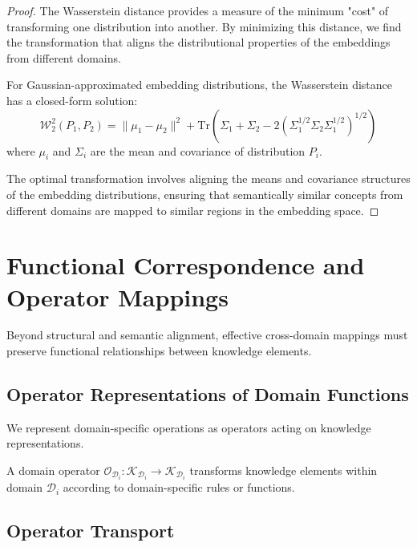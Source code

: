 \begin{proof}
The Wasserstein distance provides a measure of the minimum "cost" of transforming one distribution into another. By minimizing this distance, we find the transformation that aligns the distributional properties of the embeddings from different domains.

For Gaussian-approximated embedding distributions, the Wasserstein distance has a closed-form solution:
\begin{equation}
\mathcal{W}_2^2(P_1, P_2) = \|\mu_1 - \mu_2\|^2 + \text{Tr}(\Sigma_1 + \Sigma_2 - 2(\Sigma_1^{1/2}\Sigma_2\Sigma_1^{1/2})^{1/2})
\end{equation}
where $\mu_i$ and $\Sigma_i$ are the mean and covariance of distribution $P_i$.

The optimal transformation involves aligning the means and covariance structures of the embedding distributions, ensuring that semantically similar concepts from different domains are mapped to similar regions in the embedding space.
\end{proof}

\section{Functional Correspondence and Operator Mappings}

Beyond structural and semantic alignment, effective cross-domain mappings must preserve functional relationships between knowledge elements.

\subsection{Operator Representations of Domain Functions}

We represent domain-specific operations as operators acting on knowledge representations.

\begin{definition}
A domain operator $\mathcal{O}_{\mathcal{D}_i}: \mathcal{K}_{\mathcal{D}_i} \rightarrow \mathcal{K}_{\mathcal{D}_i}$ transforms knowledge elements within domain $\mathcal{D}_i$ according to domain-specific rules or functions.
\end{definition}

\subsection{Operator Transport}


